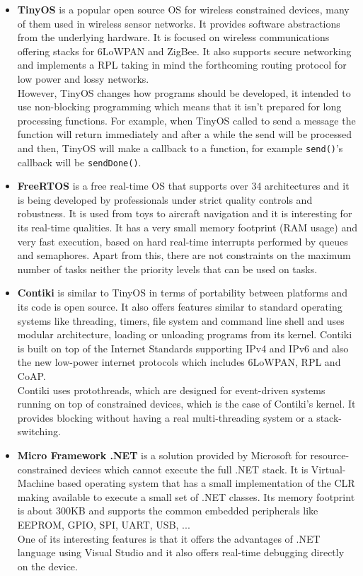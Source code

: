 \begin{itemize}
\item \textbf{TinyOS} is a popular open source OS for wireless constrained devices, many of them used in wireless sensor networks. It provides software abstractions from the underlying hardware. It is focused on wireless communications offering stacks for 6LoWPAN and ZigBee. It also supports secure networking and implements a \gls{RPL} taking in mind the forthcoming routing protocol for low power and lossy networks.
\\
However, TinyOS changes how programs should be developed, it intended to use non-blocking programming which means that it isn't prepared for long processing functions. For example, when TinyOS called to send a message the function will return immediately and after a while the send will be processed and then, TinyOS will make a callback to a function, for example \verb!send()!'s callback will be \verb!sendDone()!.

\item \textbf{FreeRTOS} is a free real-time OS that supports over 34 architectures and it is being developed by professionals under strict quality controls and robustness. It is used from toys to aircraft navigation and it is interesting for its real-time qualities. It has a very small memory footprint (RAM usage) and very fast execution, based on hard real-time interrupts performed by queues and semaphores. Apart from this, there are not constraints on the maximum number of tasks neither the priority levels that can be used on tasks. 

\item \textbf{Contiki} is similar to TinyOS in terms of portability between platforms and its code is open source. It also offers features similar to standard operating systems like threading, timers, file system and command line shell and uses modular architecture, loading or unloading programs from its kernel. Contiki is built on top of the Internet Standards supporting IPv4 and IPv6 and also the new low-power internet protocols which includes 6LoWPAN, RPL and CoAP.
\\
Contiki uses protothreads, which are designed for event-driven systems running on top of constrained devices, which is the case of Contiki's kernel. It provides blocking without having a real multi-threading system or a stack-switching.

\item \textbf{Micro Framework .NET} is a solution provided by Microsoft for resource-constrained devices which cannot execute the full .NET stack. It is Virtual-Machine based operating system that has a small implementation of the CLR making available to execute a small set of .NET classes. Its memory footprint is about 300KB and supports the common embedded peripherals like EEPROM, GPIO, SPI, UART, USB, ...
\\
One of its interesting features is that it offers the advantages of .NET language using Visual Studio and it also offers real-time debugging directly on the device.
\end{itemize}

